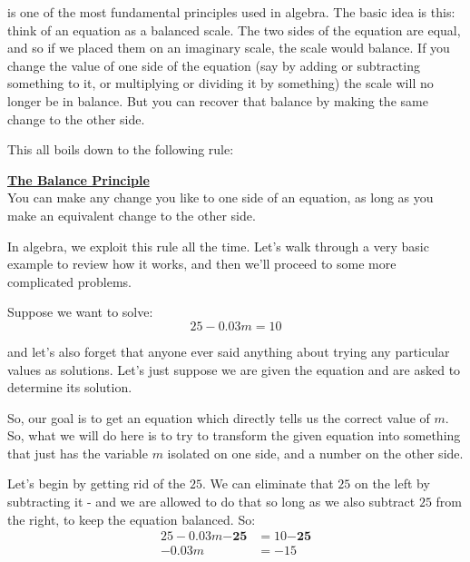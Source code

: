 
 is one of the most fundamental principles used in algebra.  The basic idea is this: think of an equation as a balanced scale.  The two sides of the equation are equal, and so if we placed them on an imaginary scale, the scale would balance.  If you change the value of one side of the equation (say by adding or subtracting something to it, or multiplying or dividing it by something) the scale will no longer be in balance.  But you can recover that balance by making the same change to the other side.

This all boils down to the following rule:

\begin{definition}
	\textbf{\underline{The Balance Principle}}\\
	\bigskip
	You can make any change you like to one side of an equation, as long as you make an equivalent change to the other side.
\end{definition}

In algebra, we exploit this rule all the time. Let’s walk through a very basic example to review how it works, and then we’ll proceed to some more complicated problems.

Suppose we want to solve:
$$25 - 0.03m = 10$$

and let’s also forget that anyone ever said anything about trying any particular values as solutions.  Let’s just suppose we are given the equation and are asked to determine its solution.

So, our goal is to get an equation which directly tells us the correct value of $m$. So, what we will do here is to try to transform the given equation into something that just has the variable $m$ isolated on one side, and a number on the other side.

Let’s begin by getting rid of the $25$. We can eliminate that $25$ on the left by subtracting it - and we are allowed to do that so long as we also subtract $25$ from the right, to keep the equation balanced. So:
\begin{align*}
	25-0.03m\bm{-25} & = 10\bm{-25}\\
	-0.03m & = -15
\end{align*}

